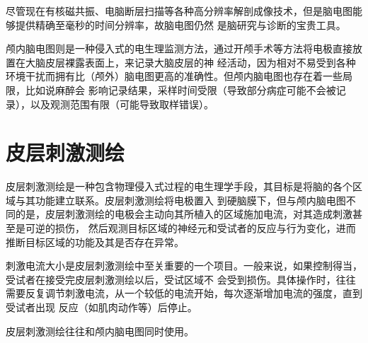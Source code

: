 \documentclass[scheme=plain,12pt]{ctexart}
\begin{document}
    尽管现在有核磁共振、电脑断层扫描等各种高分辨率解剖成像技术，但是脑电图能够提供精确至毫秒的时间分辨率，故脑电图仍然
    是脑研究与诊断的宝贵工具。

    颅内脑电图则是一种侵入式的电生理监测方法，通过开颅手术等方法将电极直接放置在大脑皮层裸露表面上，来记录大脑皮层的神
    经活动，因为相对不易受到各种环境干扰而拥有比（颅外）脑电图更高的准确性。但颅内脑电图也存在着一些局限，比如说麻醉会
    影响记录结果，采样时间受限（导致部分病症可能不会被记录），以及观测范围有限（可能导致取样错误）。

    \section{皮层刺激测绘}

    皮层刺激测绘是一种包含物理侵入式过程的电生理学手段，其目标是将脑的各个区域与其功能建立联系。皮层刺激测绘将电极置入
    到硬脑膜下，但与颅内脑电图不同的是，皮层刺激测绘的电极会主动向其所植入的区域施加电流，对其造成刺激甚至是可逆的损伤，
    然后观测目标区域的神经元和受试者的反应与行为变化，进而推断目标区域的功能及其是否存在异常。

    刺激电流大小是皮层刺激测绘中至关重要的一个项目。一般来说，如果控制得当，受试者在接受完皮层刺激测绘以后，受试区域不
    会受到损伤。具体操作时，往往需要反复调节刺激电流，从一个较低的电流开始，每次逐渐增加电流的强度，直到受试者出现
    反应（如肌肉动作等）后停止。

    皮层刺激测绘往往和颅内脑电图同时使用。
\end{document}
